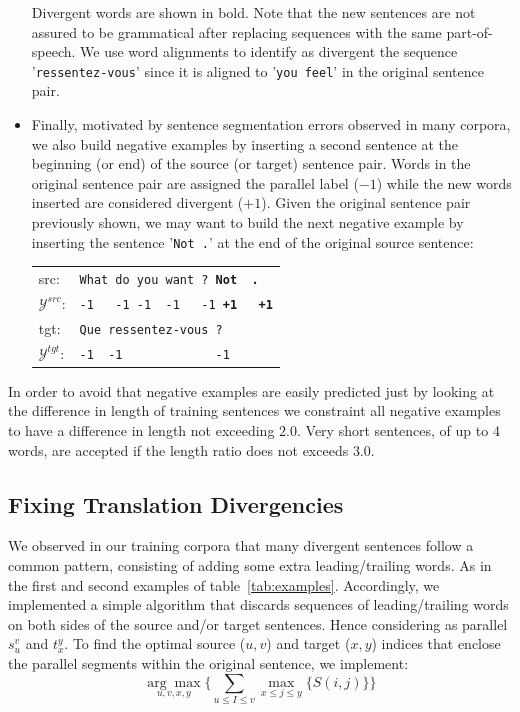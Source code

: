 \documentclass[11pt,a4paper]{article}
\begin{document}
\begin{itemize}
Divergent words are shown in bold. 
Note that the new sentences are not assured to be grammatical after replacing sequences with the same part-of-speech.
We use word alignments to identify as divergent the sequence '\texttt{ressentez-vous}' since it is aligned to '\texttt{you feel}' in the original sentence pair.

\item Finally, motivated by sentence segmentation errors observed in many corpora, we also build negative examples by inserting a second sentence at the beginning (or end) of the source (or target) sentence pair. 
Words in the original sentence pair are assigned the parallel label ($-1$) while the new words inserted are considered divergent ($+1$).
Given the original sentence pair previously shown, we may want to build the next negative example by inserting the sentence '\texttt{Not .}' at the end of the original source sentence:

\begin{table}[h]
\center
\begin{tabular}{ll}
src: & { \small \texttt{What do you want ? {\bf Not \ .}}} \\
$\mathcal{Y}^{src}$: & { \small \texttt{-1 \ \  -1 -1 \ -1  \ \ -1 {\bf +1\ \ \  +1}}} \\
tgt: & { \small \texttt{Que ressentez-vous ?}} \\
$\mathcal{Y}^{tgt}$: & { \small \texttt{-1\ \ -1\ \ \ \ \ \ \ \ \ \ \ \ \ -1}} \\
\end{tabular}
\end{table}

\end{itemize}

In order to avoid that negative examples are easily predicted just by looking at the difference in length of training sentences we constraint all negative examples to have a difference in length not exceeding $2.0$. Very short sentences, of up to $4$ words, are accepted if the length ratio does not exceeds $3.0$.

\subsection{Fixing Translation Divergencies}
\label{correction}

We observed in our training corpora that many divergent sentences follow a common pattern, consisting of adding some extra leading/trailing words.
As in the first and second examples of table~\ref{tab:examples}.
Accordingly, we implemented a simple algorithm that discards sequences of leading/trailing words on both sides of the source and/or target sentences. 
Hence considering as parallel $s_u^v$ and $t_x^y$. 
To find the optimal source ($u, v$) and target ($x, y$) indices that enclose the parallel segments within the original sentence, we implement:
\begin{equation*}
\underset{u, v, x, y}{\arg\max} \Big \{      \underset{u \le I \le v}{\sum} \underset{x \le j \le y}{\max} \{ S(i,j) \}    \Big \}
\end{equation*}
\end{document}

